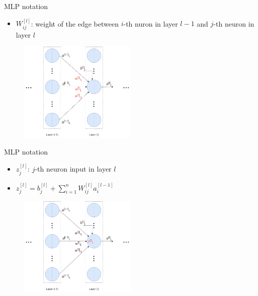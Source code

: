 \begin{frame}{MLP notation}
    \begin{itemize}
        \item $W^{[l]}_{ij}$: weight of the edge between $i$-th nuron in layer $l-1$ and $j$-th neuron in layer $l$ 
    \end{itemize}
    \begin{figure}[H]
        \centering
        \includegraphics[width=0.5\textwidth]{Figs/notation2.png}
    \end{figure}
\end{frame}

\begin{frame}{MLP notation}
    \begin{itemize}
        \item $z^{[l]}_j$: $j$-th neuron input in layer $l$
        \item $z^{[l]}_j = b_j^{[l]} + \sum_{i=1}^n W^{[l]}_{ij}a^{[l-1]}_i$
    \end{itemize}
    \begin{figure}[H]
        \centering
        \includegraphics[width=0.5\textwidth]{Figs/notation3.png}
    \end{figure}
\end{frame}

